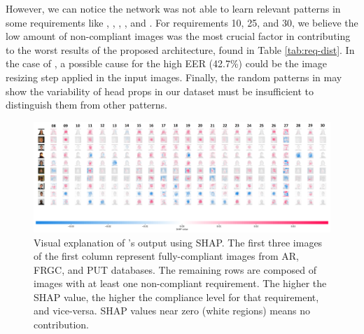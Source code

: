However, we can notice the network was not able to learn relevant patterns in some requirements like \citeReq{\inkmarked}, \citeReq{\pixelation}, \citeReq{\framestooheavy}, \citeReq{\hatcap}, and \citeReq{\otherfacesortoys}. For requirements 10, 25, and 30, we believe the low amount of non-compliant images was the most crucial factor in contributing to the worst results of the proposed architecture, found in Table \ref{tab:req-dist}. In the case of \citeReq{\pixelation}, a possible cause for the high EER (42.7\%) could be the image resizing step applied in the input images. Finally, the random patterns in \citeReq{\hatcap} may show the variability of head props in our dataset must be insufficient to distinguish them from other patterns. 

\begin{landscape}
\begin{figure}[t]
    \centering
    \includegraphics[width=\linewidth]{images/shap.png}
    \caption{Visual explanation of \methodname's output using SHAP. The first three images of the first column represent fully-compliant images from AR, FRGC, and PUT databases. The remaining rows are composed of images with at least one non-compliant requirement. The higher the SHAP value, the higher the compliance level for that requirement, and vice-versa. SHAP values near zero (white regions) means no contribution.}
    \label{fig:shap}
\end{figure}
\end{landscape}

